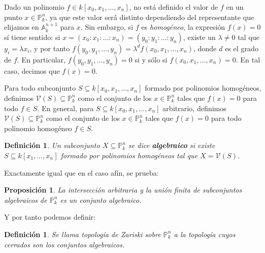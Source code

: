 \documentclass[a4paper,10pt]{book}
\newtheorem{prop}[thm]{Proposición}
\newtheorem{defn}[thm]{Definición}
\newtheorem{eje}[thm]{Ejemplos}
\newcommand{\AAA}{\mathbb A}
\newcommand{\PP}{\mathbb P}
\newcommand{\Pnk}{\PP^n_k}
\newcommand{\VV}{{\mathcal V}}
\begin{document}
Dado un polinomio $f\in k[x_0,x_1,\ldots,x_n]$, no está definido el valor de $f$ en un punto $x\in\Pnk$, ya que este valor será distinto dependiendo del representante que elijamos en $\AAA^{n+1}_k$ para $x$. Sin embargo, si $f$ es \emph{homogéneo}, la expresión $f(x)=0$ sí tiene sentido: si $x=(x_0:x_1:\ldots:x_n)=(y_0:y_1:\ldots:y_n)$, existe un $\lambda\neq 0$ tal que $y_i=\lambda x_i$, y por tanto $f(y_0,y_1,\ldots,y_n)=\lambda^df(x_0,x_1,\ldots,x_n)$, donde $d$ es el grado de $f$. En particular, $f(y_0,y_1,\ldots,y_n)=0$ si y sólo si $f(x_0,x_1,\ldots,x_n)=0$. En tal caso, decimos que $f(x)=0$.

Para todo subconjunto $S\subseteq k[x_0,x_1,\ldots,x_n]$ formado por polinomios homogéneos, definimos $\VV(S)\subseteq \Pnk$ como el conjunto de los $x\in\Pnk$ tales que $f(x)=0$ para todo $f\in S$. En general, para $S\subseteq k[x_0,x_1,\ldots,x_n]$ arbitrario, definimos $\VV(S)\subseteq \Pnk$ como el conjunto de los $x\in\Pnk$ tales que $f(x)=0$ para todo polinomio homogéneo $f\in S$. 

\begin{defn}
 Un subconjunto $X\subseteq\Pnk$ se dice {\bf algebraico} si existe $S\subseteq k[x_1,\ldots,x_n]$ formado por polinomios homogéneos tal que $X=\VV(S)$.
\end{defn}


Exactamente igual que en el caso afín, se prueba:

\begin{prop}
  La intersección arbitraria y la unión finita de subconjuntos algebraicos de $\Pnk$ es un conjunto algebraico.
\end{prop}

Y por tanto podemos definir:

\begin{defn}
 Se llama \emph{topología de Zariski} sobre $\Pnk$ a la topología cuyos cerrados son los conjuntos algebraicos.
\end{defn}
\end{document}
